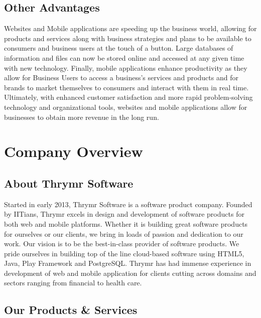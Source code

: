 \documentclass[a4paper]{article}
\begin{document}
	\subsection{Other Advantages}
	Websites and Mobile applications are speeding up the business world, allowing for products and services along with business strategies and plans to be available to consumers and business users at the touch of a button. Large databases of information and files can now be stored online and accessed at any given time with new technology.  Finally, mobile applications enhance productivity as they allow for Business Users to access a business’s services and products and for brands to market themselves to consumers and interact with them in real time.  Ultimately, with enhanced customer satisfaction and more rapid problem-solving technology and organizational tools, websites and mobile applications allow for businesses to obtain more revenue in the long run.
	
	\newpage
	
	\section{Company Overview}
	
	\subsection{About Thrymr Software}
	Started in early 2013, Thrymr Software is a software product company. Founded by IITians, Thrymr excels in design and development of software products for both web and mobile platforms. Whether it is building great software products for ourselves or our clients, we bring in loads of passion and dedication to our work. Our vision is to be the best-in-class provider of software products.
	We pride ourselves in building top of the line cloud-based software using HTML5, Java, Play Framework and PostgreSQL.
	Thrymr has had immense experience in development of web and mobile application for clients cutting across domains and sectors ranging from financial to health care.
	
	\subsection{Our Products \& Services}
	
\end{document}
